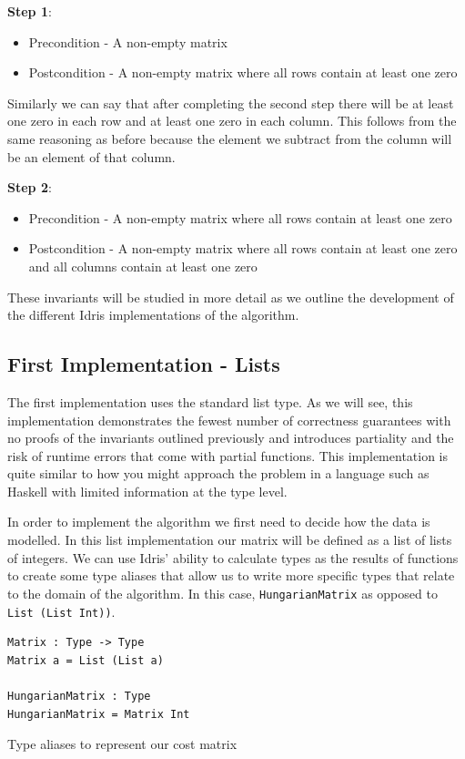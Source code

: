 \documentclass[a4paper, notitlepage]{report}
\begin{document}
\textbf{Step 1}:
\begin{itemize}
\item Precondition - A non-empty matrix
\item Postcondition - A non-empty matrix where all rows contain at least one zero
\end{itemize}

Similarly we can say that after completing the second step there will be at
least one zero in each row and at least one zero in each column. This follows
from the same reasoning as before because the element we subtract from the
column will be an element of that column.

\textbf{Step 2}:
\begin{itemize}
\item Precondition - A non-empty matrix where all rows contain at least one zero
\item Postcondition - A non-empty matrix where all rows contain at least one zero
and all columns contain at least one zero
\end{itemize}

These invariants will be studied in more detail as we outline the development of
the different Idris implementations of the algorithm.

\subsection{First Implementation - Lists}
\label{sec:orge76d395}
The first implementation uses the standard list type. As we will see, this
implementation demonstrates the fewest number of correctness guarantees with no
proofs of the invariants outlined previously and introduces partiality and the
risk of runtime errors that come with partial functions. This implementation is
quite similar to how you might approach the problem in a language such as
Haskell with limited information at the type level.

In order to implement the algorithm we first need to decide how the data is
modelled. In this list implementation our matrix will be defined as a list of
lists of integers. We can use Idris' ability to calculate types as the results
of functions to create some type aliases that allow us to write more specific
types that relate to the domain of the algorithm. In this case, \texttt{HungarianMatrix}
as opposed to \texttt{List (List Int))}.

\begin{listing}[H]
\begin{verbatim}
Matrix : Type -> Type
Matrix a = List (List a)

HungarianMatrix : Type
HungarianMatrix = Matrix Int
\end{verbatim}
\caption{Type aliases to represent our cost matrix}
\end{listing}
\end{document}
